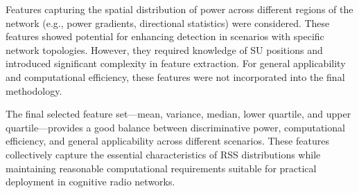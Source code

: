 Features capturing the spatial distribution of power across different regions of the network (e.g., power gradients, directional statistics) were considered. These features showed potential for enhancing detection in scenarios with specific network topologies. However, they required knowledge of SU positions and introduced significant complexity in feature extraction. For general applicability and computational efficiency, these features were not incorporated into the final methodology.

The final selected feature set—mean, variance, median, lower quartile, and upper quartile—provides a good balance between discriminative power, computational efficiency, and general applicability across different scenarios. These features collectively capture the essential characteristics of RSS distributions while maintaining reasonable computational requirements suitable for practical deployment in cognitive radio networks.
